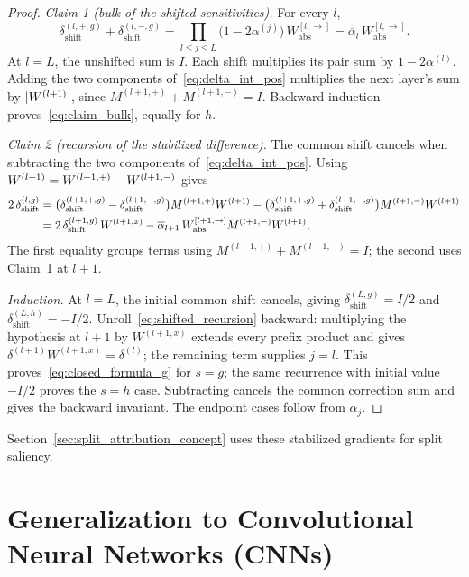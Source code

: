 \begin{proof}
\emph{Claim 1 (bulk of the shifted sensitivities).} For every $l$,
\begin{equation}
	\delta_{\mathrm{shift}}^{(l,+,g)} + \delta_{\mathrm{shift}}^{(l,-,g)} = \prod_{l \le j \le L} \bigl( 1 - 2\alpha^{(j)} \bigr)\, W_{\mathrm{abs}}^{[l, \rightarrow]} = \overline{\alpha}_l\, W_{\mathrm{abs}}^{[l, \rightarrow]}.
	\label{eq:claim_bulk}
\end{equation}
At $l=L$, the unshifted sum is $I$. Each shift multiplies its pair sum by $1-2\alpha^{(l)}$. Adding the two components of~\eqref{eq:delta_int_pos} multiplies the next layer's sum by $|W^{(l+1)}|$, since $M^{(l+1,+)}+M^{(l+1,-)}=I$. Backward induction proves~\eqref{eq:claim_bulk}, equally for $h$.

\emph{Claim 2 (recursion of the stabilized difference).} The common shift cancels when subtracting the two components of~\eqref{eq:delta_int_pos}. Using $W^{(l+1)}=W^{(l+1,+)}-W^{(l+1,-)}$ gives
\begin{align}
	2\, \delta_{\mathrm{shift}}^{(l,g)}
	&= \bigl( \delta_{\mathrm{shift}}^{(l+1,+,g)} - \delta_{\mathrm{shift}}^{(l+1,-,g)} \bigr) M^{(l+1,+)} W^{(l+1)}
	- \bigl( \delta_{\mathrm{shift}}^{(l+1,+,g)} + \delta_{\mathrm{shift}}^{(l+1,-,g)} \bigr) M^{(l+1,-)} W^{(l+1)} \notag\\
	&= 2\, \delta_{\mathrm{shift}}^{(l+1,g)}\, W^{(l+1,x)} - \overline{\alpha}_{l+1}\, W_{\mathrm{abs}}^{[l+1, \rightarrow]} M^{(l+1,-)} W^{(l+1)},
	\label{eq:shifted_recursion}
\end{align}
The first equality groups terms using $M^{(l+1,+)} + M^{(l+1,-)} = I$; the second uses Claim~1 at $l+1$.

\emph{Induction.} At $l=L$, the initial common shift cancels, giving $\delta_{\mathrm{shift}}^{(L,g)}=I/2$ and $\delta_{\mathrm{shift}}^{(L,h)}=-I/2$. Unroll~\eqref{eq:shifted_recursion} backward: multiplying the hypothesis at $l+1$ by $W^{(l+1,x)}$ extends every prefix product and gives $\delta^{(l+1)}W^{(l+1,x)}=\delta^{(l)}$; the remaining term supplies $j=l$. This proves~\eqref{eq:closed_formula_g} for $s=g$; the same recurrence with initial value $-I/2$ proves the $s=h$ case. Subtracting cancels the common correction sum and gives the backward invariant. The endpoint cases follow from $\overline{\alpha}_j$.
\end{proof}
Section~\ref{sec:split_attribution_concept} uses these stabilized gradients for split saliency.

\section{Generalization to Convolutional Neural Networks (CNNs)}\label{sec:cnn_decompositions}

